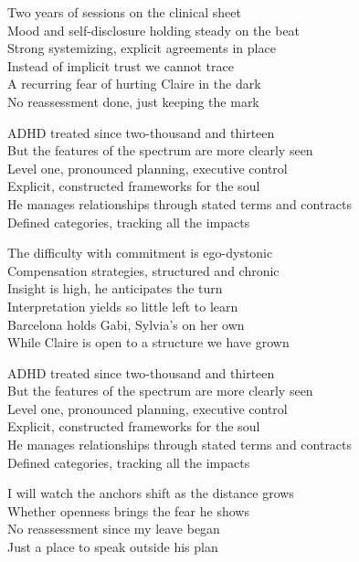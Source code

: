 \begin{lyrics}

Two years of sessions on the clinical sheet\\
Mood and self-disclosure holding steady on the beat\\
Strong systemizing, explicit agreements in place\\
Instead of implicit trust we cannot trace\\
A recurring fear of hurting Claire in the dark\\
No reassessment done, just keeping the mark

ADHD treated since two-thousand and thirteen\\
But the features of the spectrum are more clearly seen\\
Level one, pronounced planning, executive control\\
Explicit, constructed frameworks for the soul\\
He manages relationships through stated terms and contracts\\
Defined categories, tracking all the impacts

The difficulty with commitment is ego-dystonic\\
Compensation strategies, structured and chronic\\
Insight is high, he anticipates the turn\\
Interpretation yields so little left to learn\\
Barcelona holds Gabi, Sylvia's on her own\\
While Claire is open to a structure we have grown


ADHD treated since two-thousand and thirteen\\
But the features of the spectrum are more clearly seen\\
Level one, pronounced planning, executive control\\
Explicit, constructed frameworks for the soul\\
He manages relationships through stated terms and contracts\\
Defined categories, tracking all the impacts

I will watch the anchors shift as the distance grows\\
Whether openness brings the fear he shows\\
No reassessment since my leave began\\
Just a place to speak outside his plan
\end{lyrics}

